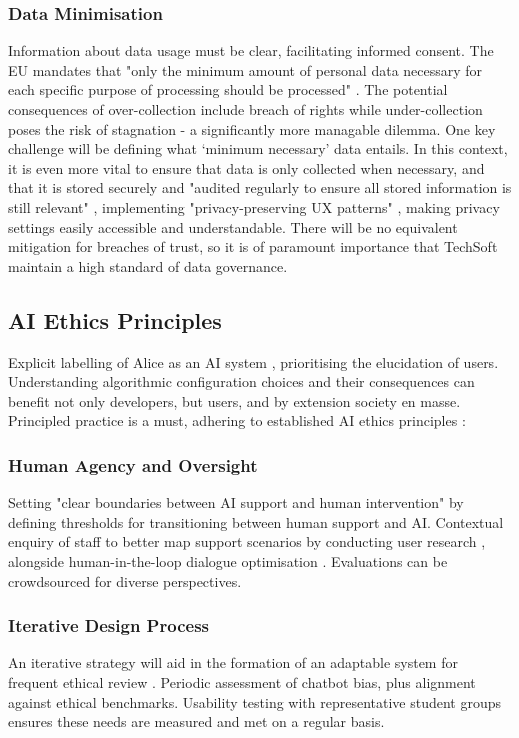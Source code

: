 \documentclass[14pt,a4paper]{article}
\begin{document}
\begin{multicols}{2}
\subsubsection{Data Minimisation}
Information about data usage must be clear, facilitating informed consent.
The EU mandates that "only the minimum amount of personal data necessary for each specific purpose of processing should be processed" \textit{\parencite{EU2016}}.
The potential consequences of over-collection include breach of rights while under-collection poses the risk of stagnation - a significantly more managable dilemma.
One key challenge will be defining what `minimum necessary' data entails.
In this context, it is even more vital to ensure that data is only collected when necessary, and that it is stored securely and "audited regularly to ensure all stored information is still relevant" \textit{\parencite{A29WP2018}}, implementing "privacy-preserving UX patterns" \textit{\parencite[pp. 50-100]{Hartzog2024}}, making privacy settings easily accessible and understandable.
There will be no equivalent mitigation for breaches of trust, so it is of paramount importance that TechSoft maintain a high standard of data governance.

\subsection{AI Ethics Principles}
Explicit labelling of Alice as an AI system \textit{\parencite{IEEE2024}}, prioritising the elucidation of users.
Understanding algorithmic configuration choices and their consequences can benefit not only developers, but users, and by extension society en masse.
Principled practice is a must, adhering to established AI ethics principles \textit{\parencite{EC2024}}:

\subsubsection{Human Agency and Oversight}

Setting "clear boundaries between AI support and human intervention" \textit{\parencite{APA2024}} by defining thresholds for transitioning between human support and AI.
Contextual enquiry of staff to better map support scenarios by conducting user research \textit{\parencite[pp. 50-100]{Goodman2024}}, alongside human-in-the-loop dialogue optimisation \textit{\parencite[pp. 30-60]{Vaughan2024}}.
Evaluations can be crowdsourced for diverse perspectives.

\subsubsection{Iterative Design Process}
An iterative strategy \textit{\parencite[pp. 30-60]{HoltzblattBeyer2024}} will aid in the formation of an adaptable system for frequent ethical review \textit{\parencite{FloridiCowls2024}}.
Periodic assessment of chatbot bias, plus alignment against ethical benchmarks.
Usability testing with representative student groups ensures these needs are measured and met on a regular basis.


\end{multicols}
\end{document}

